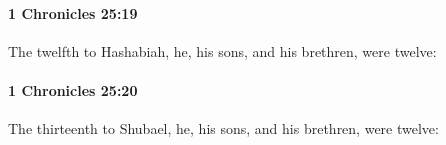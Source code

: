 		\paragraph{1 Chronicles 25:19} %
			\label{1CHRONICLES-25-19}

			The twelfth to Hashabiah, he, his sons, and his brethren, were twelve:


		\paragraph{1 Chronicles 25:20} %
			\label{1CHRONICLES-25-20}

			The thirteenth to Shubael, he, his sons, and his brethren, were twelve:


